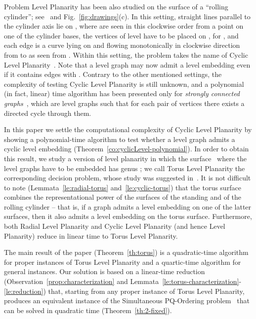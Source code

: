 \documentclass{llncs}
\begin{document}
Problem {\sc Level Planarity} has been also studied on the surface  of a ``rolling cylinder''; see~\cite{abbg-cpue-12,bb-ltpte-08,bbk-clpte-07,b-updsrc-14} and Fig.~\ref{fig:drawings}(c). 
In this setting,  straight lines  parallel to the cylinder axis lie on , where  are seen in this clockwise order from a point  on one of the cylinder bases, the vertices of level  have to be placed on , for , and each edge  is a curve  lying on  and flowing monotonically in clockwise direction from  to  as seen from .
Within this setting, the problem takes the name of {\sc Cyclic Level Planarity}~\cite{bbk-clpte-07}.
Note that a level graph  may now admit a level embedding even if it contains edges  with .
Contrary to the other mentioned settings, the complexity of testing {\sc Cyclic Level Planarity} is still unknown, and a polynomial (in fact, linear) time algorithm has been presented only for {\em strongly connected graphs}~\cite{bb-ltpte-08}, which are level graphs such that for each pair of vertices there exists a directed cycle through them. 

In this paper we settle the computational complexity of {\sc Cyclic Level Planarity} by showing a polynomial-time algorithm to test whether a level graph admits a cyclic level embedding (Theorem~\ref{co:cyclicLevel-polynomial}). 
In order to obtain this result, we study a version of level planarity in which the surface~ where the level graphs have to be embedded has genus ; we call {\sc Torus Level Planarity} the corresponding decision problem, whose study was suggested in~\cite{bbk-clpte-07}. It is not difficult to note (Lemmata~\ref{le:radial-torus} and~\ref{le:cyclic-torus}) that the torus surface combines the representational power of the surfaces of the standing and of the rolling cylinder -- that is, if a graph admits a level embedding on one of the latter surfaces, then it also admits a level embedding on the torus surface. Furthermore, both {\sc Radial Level Planarity} and {\sc Cyclic Level Planarity} (and hence {\sc Level Planarity}) reduce in linear time to {\sc Torus Level Planarity}.

The main result of the paper (Theorem~\ref{th:torus}) is a quadratic-time algorithm for proper instances of {\sc Torus Level Planarity} and a quartic-time algorithm for general instances. Our solution is based on a linear-time reduction (Observation~\ref{prop:characterization} and Lemmata~\ref{le:torus-characterization}-\ref{le:reduction}) that, starting from any proper instance of {\sc Torus Level Planarity}, produces an equivalent instance of the {\sc Simultaneous PQ-Ordering} problem~\cite{br-spacep-13} that can be solved in quadratic time (Theorem~\ref{th:2-fixed}).
\end{document}
